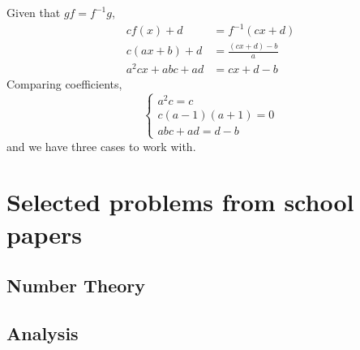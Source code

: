\begin{solution}
Given that $gf=f^{-1}g$,
\begin{align*}
cf(x)+d&=f^{-1}(cx+d)\\
c(ax+b)+d&=\frac{(cx+d)-b}{a}\\
a^2cx+abc+ad&=cx+d-b
\end{align*}
Comparing coefficients,
\[ \begin{cases}
a^2c=c\\
c(a-1)(a+1)=0\\
abc+ad=d-b
\end{cases} \]
and we have three cases to work with.
\end{solution}
\pagebreak

\section{Selected problems from school papers}
\subsection{Number Theory}
\subsection{Analysis}

